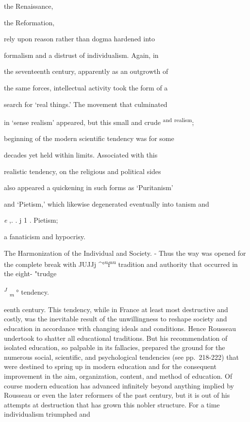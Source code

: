 \documentclass[]{book}
\begin{document}
the Renaissance,

the Reformation,

rely upon reason rather than dogma hardened into

formalism and a distrust of individualism. Again, in

the seventeenth century, apparently as an outgrowth of

the same forces, intellectual activity took the form of a

search for `real things.' The movement that culminated

in `sense realism' appeared, but this small and crude \textsuperscript{and} \textsuperscript{realism};

beginning of the modern scientific tendency was for some

decades yet held within limits. Associated with this

realistic tendency, on the religious and political sides

also appeared a quickening in such forms as `Puritanism'

and `Pietism,' which likewise degenerated eventually into tanism and

\emph{e} ,. . j 1 . Pietism;

a fanaticism and hypocrisy.

The Harmonization of the Individual and Society. - Thus the way was opened for the complete break with JUJJj \^{}°\textsuperscript{u}\textbar{}\textbar{}f\textsuperscript{au} tradition and authority that occurred in the eight- "trudge

\emph{\textsuperscript{J} \textsubscript{m}} ° tendency.

eenth century. This tendency, while in France at least most destructive and costly, was the inevitable result of the unwillingness to reshape society and education in accordance with changing ideals and conditions. Hence Rousseau undertook to shatter all educational traditions. But his recommendation of isolated education, so palpable in its fallacies, prepared the ground for the numerous social, scientific, and psychological tendencies (see pp.~218-222) that were destined to spring up in modern education and for the consequent improvement in the aim, organization, content, and method of education. Of course modern education has advanced infinitely beyond anything implied by Rousseau or even the later reformers of the past century, but it is out of his attempts at destruction that has grown this nobler structure. For a time individualism triumphed and
\end{document}
